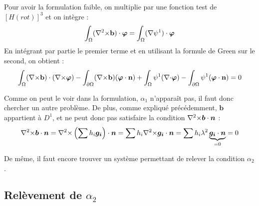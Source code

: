 Pour avoir la formulation faible, on multiplie par une fonction test de $[H(rot)]^3$ et on intègre :
\[ \int_\Omega ({\nabla^2\times} \mathbf{b})\cdot\bm{\varphi} = \int_\Omega ({\nabla}\psi^1)\cdot\bm{\varphi} \]
En intégrant par partie le premier terme et en utilisant la formule de Green sur le second, on obtient :
\begin{equation} \label{fvbcurl}
\int_\Omega ({\nabla\times} \mathbf{b})\cdot({\nabla\times}\bm{\varphi}) - \int_{\partial\Omega} ({\nabla\times} \mathbf{b})(\bm{\varphi}\cdot \mathbf{n}) + \int_\Omega \psi^1({\nabla\cdot}\bm{\varphi}) - \int_{\partial\Omega} \psi^1(\bm{\varphi}\cdot \mathbf{n}) = 0
\end{equation}

Comme on peut le voir dans la formulation, $\alpha_1$ n'apparaît pas, il faut donc chercher un autre problème. De plus, comme expliqué précédemment, $\bm{b}$ appartient à $D^1$, et ne peut donc pas satisfaire la condition ${\nabla^2\times}\bm{b}\cdot \bm{n}$ :
\[ {\nabla^2\times}\bm{b}\cdot \bm{n} = {\nabla^2\times}\left(\sum h_i \bm{g_i}\right)\cdot\bm{n} = \sum h_i {\nabla^2\times} \bm{g_i}\cdot\bm{n} = \sum h_i\lambda^2 \underbrace{\bm{g_i}\cdot\bm{n}}_{=0} = 0 \]

De même, il faut encore trouver un système permettant de relever la condition $\alpha_2$.

\subsection{Relèvement de $\alpha_2$}


